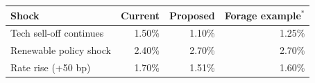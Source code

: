 \begin{tabular}{@{}lrrr@{}}
\toprule
Shock & \textbf{Current} & \textbf{Proposed} & \textbf{Forage example$^{*}$} \\
\midrule
Tech sell-off continues & \textminus{}1.50\% & \textminus{}1.10\% & \textminus{}1.25\% \\
Renewable policy shock & \textminus{}2.40\% & \textminus{}2.70\% & \textminus{}2.70\% \\
Rate rise (+50 bp) & \textminus{}1.70\% & \textminus{}1.51\% & \textminus{}1.60\% \\
\bottomrule
\end{tabular}
